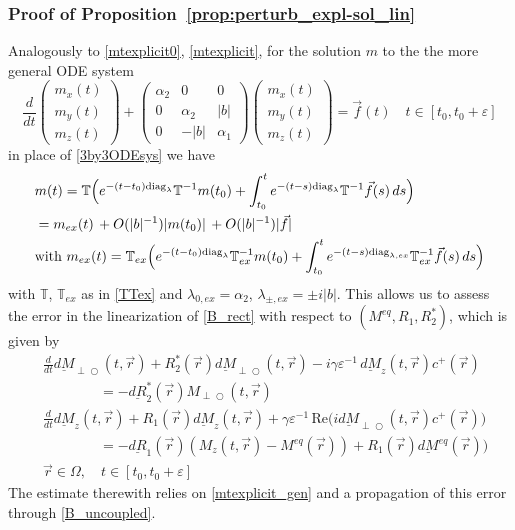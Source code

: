 \documentclass{ws-m3as}
\newcommand{\uld}[1]{\underline{d#1}}
\renewcommand\Re{\mathrm{Re}}
\def\Mpp{M_{\perp\!\!\!\!\!\bigcirc}}
\def\uldMpp{\uld{M}_{\perp\!\!\!\!\!\bigcirc}}
\def\bb{b}
\newcommand\taup{\varepsilon}
\begin{document}
\subsubsection*{Proof of Proposition~\ref{prop:perturb_expl-sol_lin}}
Analogously to \eqref{mtexplicit0}, \eqref{mtexplicit},
for the solution $m$ to the the more general ODE system
\begin{equation*}%
\frac{d}{dt}\left(\begin{array}{c}m_x(t)\\m_y(t)\\m_z(t)\end{array}\right)
+
\left(\begin{array}{ccc}
\alpha_2&0&0\\ 
0&\alpha_2&|\bb|\\
0&-|\bb|&\alpha_1\end{array}\right)
\left(\begin{array}{c}m_x(t)\\m_y(t)\\m_z(t)\end{array}\right)
={\vec f}(t)\quad t\in[t_0,t_0+\taup]
\end{equation*}
in place of \eqref{3by3ODEsys} we have 
\begin{equation}\label{mtexplicit_gen}
\begin{aligned}
&m(t)=\mathbb{T}\Bigl(e^{-(t-t_0)\text{diag}_\lambda}\mathbb{T}^{-1}m(t_0)
+\int_{t_0}^te^{-(t-s)\text{diag}_\lambda}\mathbb{T}^{-1}{\vec f}(s)\, ds\Bigr)\\
&=m_{ex}(t)\,+O(|\bb|^{-1})|m(t_0)|\, +O(|\bb|^{-1})|{\vec f}|\\
&\text{with }m_{ex}(t)=\mathbb{T}_{ex}\Bigl(e^{-(t-t_0)\text{diag}_\lambda}\mathbb{T}^{-1}_{ex}m(t_0)
+\int_{t_0}^te^{-(t-s)\text{diag}_{\lambda,ex}}\mathbb{T}^{-1}_{ex}{\vec f}(s)\, ds\Bigr)
\end{aligned}
\end{equation}
with $\mathbb{T}$, $\mathbb{T}_{ex}$
as in \eqref{TTex} and $\lambda_{0,ex}=\alpha_2$, $\lambda_{\pm,ex}=\pm i|\bb|$.
This allows us to assess the error in the linearization of \eqref{B_rect} with respect to $(M^{eq},R_1,R_2^*)$, which is given by 
\begin{equation}\label{B_rect_lin}
\begin{aligned}
&\frac{d}{dt}\uldMpp(t, \vec r) 
+ R_2^*(\vec r) \uldMpp(t, \vec r)-i\gamma \taup^{-1}\,  \uld{M}_z(t, \vec r)c^+(\vec r) \\
&\qquad\qquad=-\uld{R}_2^*(\vec r) \Mpp(t, \vec r)\\    
&\frac{d}{dt}\uld{M}_z(t, \vec r)  
+R_1(\vec r) \uld{M}_z(t, \vec r)+\gamma \taup^{-1}\, \Re\bigl(i\uldMpp(t, \vec r)c^+(\vec r)\bigr)\\
&\qquad\qquad=-\uld{R}_1(\vec r) (M_z(t, \vec r)-M^{eq}(\vec r))+R_1(\vec r)\uld{M}^{eq}(\vec r))\\
&\vec r\in\Omega, \quad t\in[t_0,t_0+\taup]
\end{aligned}
\end{equation}
The estimate therewith relies on \eqref{mtexplicit_gen} and a propagation of this error through \eqref{B_uncoupled}.
\end{document}

